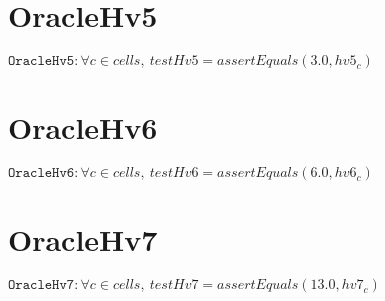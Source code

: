 \documentclass[11pt]{article}
\begin{document}
\section{OracleHv5}
$\texttt{OracleHv5} : \forall{c\in cells}, \ testHv5=assertEquals\left(3.0,hv5_{c}\right)$


\section{OracleHv6}
$\texttt{OracleHv6} : \forall{c\in cells}, \ testHv6=assertEquals\left(6.0,hv6_{c}\right)$


\section{OracleHv7}
$\texttt{OracleHv7} : \forall{c\in cells}, \ testHv7=assertEquals\left(13.0,hv7_{c}\right)$
\end{document}
